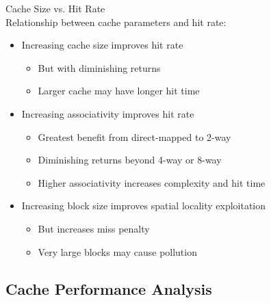 \begin{concept}{Cache Size vs. Hit Rate}\\
Relationship between cache parameters and hit rate:
\begin{itemize}
    \item Increasing cache size improves hit rate
    \begin{itemize}
        \item But with diminishing returns
        \item Larger cache may have longer hit time
    \end{itemize}
    \item Increasing associativity improves hit rate
    \begin{itemize}
        \item Greatest benefit from direct-mapped to 2-way
        \item Diminishing returns beyond 4-way or 8-way
        \item Higher associativity increases complexity and hit time
    \end{itemize}
    \item Increasing block size improves spatial locality exploitation
    \begin{itemize}
        \item But increases miss penalty
        \item Very large blocks may cause pollution
    \end{itemize}
\end{itemize}
\end{concept}

\subsection{Cache Performance Analysis}

